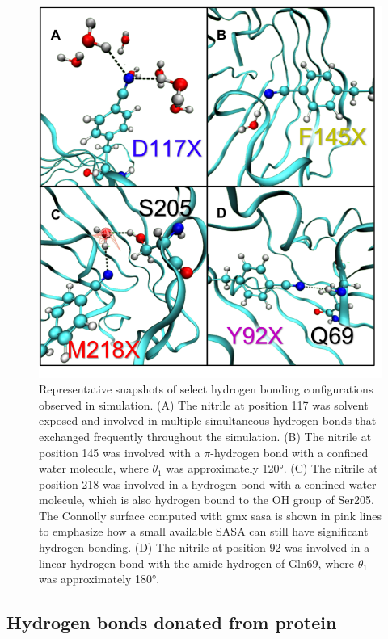 \begin{figure}
    \center
    \includegraphics[width=\single]{figures-gfp-hbond/snapshots.png}
    \caption{
        Representative snapshots of select hydrogen bonding configurations observed in simulation. 
        (A) The nitrile at position 117 was solvent exposed and involved in multiple simultaneous hydrogen bonds that exchanged frequently throughout the simulation. 
        (B) The nitrile at position 145 was involved with a $\pi$-hydrogen bond with a confined water molecule, where $\theta_1$ was approximately \ang{120}. 
        (C) The nitrile at position 218 was involved in a hydrogen bond with a confined water molecule, which is also hydrogen bound to the OH group of Ser205. 
        The Connolly surface computed with gmx sasa is shown in pink lines to emphasize how a small available SASA can still have significant hydrogen bonding. 
        (D) The nitrile at position 92 was involved in a linear hydrogen bond with the amide hydrogen of Gln69, where $\theta_1$ was approximately \ang{180}.
    }
    \label{fig:hbond-snapshot}
\end{figure}

\subsection{Hydrogen bonds donated from protein}

